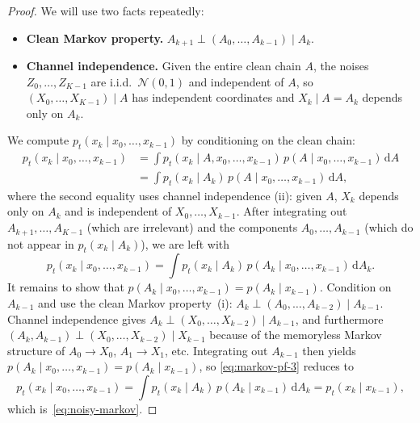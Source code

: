 \documentclass[11pt,a4paper,openany]{book}
\theoremstyle{plainserif}
\theoremstyle{definition}
\theoremstyle{remarkstyle}
\newcommand{\Normal}{\mathcal{N}}
\begin{document}
\begin{proof}
We will use two facts repeatedly:
\begin{itemize}[leftmargin=2em, topsep=3pt]
\item[(i)] \textbf{Clean Markov property.}
$A_{k+1} \perp (A_0,\ldots,A_{k-1}) \mid A_k$.
\item[(ii)] \textbf{Channel independence.}
Given the entire clean chain $A$, the noises $Z_0,\ldots,Z_{K-1}$
are i.i.d.\ $\Normal(0,1)$ and independent of $A$, so
$(X_0, \ldots, X_{K-1}) \mid A$ has independent coordinates and
$X_k \mid A = A_k$ depends only on $A_k$.
\end{itemize}
We compute $p_t(x_k \mid x_0, \ldots, x_{k-1})$ by conditioning on the clean
chain:
\begin{align}
p_t(x_k \mid x_0, \ldots, x_{k-1})
 &= \int p_t(x_k \mid A, x_0, \ldots, x_{k-1}) \,
        p(A \mid x_0, \ldots, x_{k-1}) \,\mathrm{d}A
 \label{eq:markov-pf-1}\\
 &= \int p_t(x_k \mid A_k)\,
        p(A \mid x_0, \ldots, x_{k-1}) \,\mathrm{d}A,
 \label{eq:markov-pf-2}
\end{align}
where the second equality uses channel independence (ii): given $A$,
$X_k$ depends only on $A_k$ and is independent of
$X_0,\ldots,X_{k-1}$. After integrating out $A_{k+1},\ldots,A_{K-1}$
(which are irrelevant) and the components $A_0, \ldots, A_{k-1}$ (which
do not appear in $p_t(x_k \mid A_k)$), we are left with
\begin{equation}
p_t(x_k \mid x_0, \ldots, x_{k-1}) =
\int p_t(x_k \mid A_k)\, p(A_k \mid x_0, \ldots, x_{k-1}) \,\mathrm{d}A_k.
\label{eq:markov-pf-3}
\end{equation}
It remains to show that
$p(A_k \mid x_0,\ldots,x_{k-1}) = p(A_k \mid x_{k-1})$.
Condition on $A_{k-1}$ and use the clean Markov property~(i):
$A_k \perp (A_0,\ldots,A_{k-2}) \mid A_{k-1}$.
Channel independence gives
$A_k \perp (X_0,\ldots,X_{k-2}) \mid A_{k-1}$,
and furthermore
$(A_k, A_{k-1}) \perp (X_0,\ldots,X_{k-2}) \mid X_{k-1}$
because of the memoryless Markov structure of
$A_0 \to X_0$, $A_1 \to X_1$, etc.
Integrating out $A_{k-1}$ then yields
$p(A_k \mid x_0,\ldots,x_{k-1}) = p(A_k \mid x_{k-1})$, so
\eqref{eq:markov-pf-3} reduces to
\begin{equation*}
p_t(x_k \mid x_0, \ldots, x_{k-1}) =
\int p_t(x_k \mid A_k)\, p(A_k \mid x_{k-1}) \,\mathrm{d}A_k
= p_t(x_k \mid x_{k-1}),
\end{equation*}
which is~\eqref{eq:noisy-markov}.
\end{proof}
\end{document}
